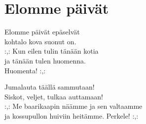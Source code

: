 \section{Elomme päivät}

Elomme päivät epäselvät\\
kohtalo kova suonut on.\\
:,: Kun eilen tulin tänään kotia\\
ja tänään tulen huomenna. \\
Huomenta! :,:

Jumalauta täällä sammutaan!\\
Siskot, veljet, tulkaa auttamaan!\\
:,: Me baarikaapin näämme ja sen valtaamme  \\
ja kossupullon huiviin heitämme. Perkele! :,: